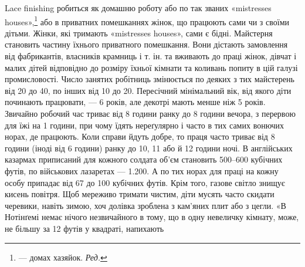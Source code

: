 Lace finishing робиться як домашню роботу або по так званих
«\textenglish{mistresses houses}»,\footnote*{
— домах хазяйок. \emph{Ред.}
} або в приватних помешканнях жінок, що
працюють сами чи з своїми дітьми. Жінки, які тримають «\textenglish{mistresses houses}», сами є бідні. Майстерня становить частину їхнього
приватного помешкання. Вони дістають замовлення від фабрикантів,
власників крамниць і т. ін. та вживають до праці жінок,
дівчат і малих дітей відповідно до розміру їхньої кімнати та коливань
попиту в цій галузі промисловості. Число занятих робітниць
змінюється по деяких з тих майстерень від 20 до 40, по інших від
10 до 20. Пересічний мінімальний вік, від якого діти починають
працювати, — 6 років, але декотрі мають менше ніж 5 років. Звичайно
робочий час триває від 8 години ранку до 8 години вечора,
з перервою для їжі на 1 години, при чому їдять нереґулярно
і часто в тих самих вонючих норах, де працюють. Коли справи
йдуть добре, то праця часто триває від 8 години (іноді від 6 години)
ранку до 10, 11 або й 12 години ночі. В англійських казармах
приписаний для кожного солдата об’єм становить 500--600 кубічних
футів, по військових лазаретах — 1.200. А по тих норах
для праці на кожну особу припадає від 67 до 100 кубічних
футів. Крім того, газове світло знищує кисень повітря. Щоб
мереживо тримати чистим, діти мусять часто скидати черевики,
навіть зимою, хоч долівка зроблена з кам’яних плит або з цегли.
«В Нотінґемі немає нічого незвичайного в тому, що в одну невеличку
кімнату, може, не більшу за 12 футів у квадраті, напихають
\parbreak{}  %
